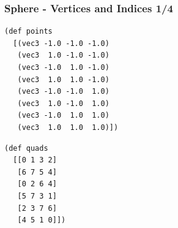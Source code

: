 \documentclass[aspectratio=169,11pt,xcolor=dvipsnames]{beamer}
\begin{document}
\begin{frame}[fragile]
  \frametitle{Sphere {-} Vertices and Indices 1/4}
  \begin{center}
    \begin{minipage}[t]{.4\textwidth}
      \begin{verbatim}
(def points
  [(vec3 -1.0 -1.0 -1.0)
   (vec3  1.0 -1.0 -1.0)
   (vec3 -1.0  1.0 -1.0)
   (vec3  1.0  1.0 -1.0)
   (vec3 -1.0 -1.0  1.0)
   (vec3  1.0 -1.0  1.0)
   (vec3 -1.0  1.0  1.0)
   (vec3  1.0  1.0  1.0)])
      \end{verbatim}
    \end{minipage}
    \begin{minipage}[t]{.4\textwidth}
      \begin{verbatim}
(def quads
  [[0 1 3 2]
   [6 7 5 4]
   [0 2 6 4]
   [5 7 3 1]
   [2 3 7 6]
   [4 5 1 0]])
      \end{verbatim}
    \end{minipage}
  \end{center}
\end{frame}
\end{document}
